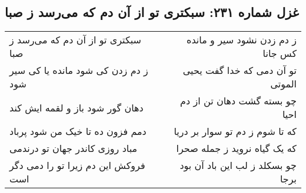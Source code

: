 \begin{center}
\section*{غزل شماره ۲۳۱: سبکتری تو از آن دم که می‌رسد ز صبا}
\label{sec:0231}
\begin{longtable}{l p{0.5cm} r}
سبکتری تو از آن دم که می‌رسد ز صبا
&&
ز دم زدن نشود سیر و مانده کس جانا
\\
ز دم زدن کی شود مانده یا کی سیر شود
&&
تو آن دمی که خدا گفت یحیی الموتی
\\
دهان گور شود باز و لقمه ایش کند
&&
چو بسته گشت دهان تن از دم احیا
\\
دمم فزون ده تا خیک من شود پرباد
&&
که تا شوم ز دم تو سوار بر دریا
\\
مباد روزی کاندر جهان تو درندمی
&&
که یک گیاه نروید ز جمله صحرا
\\
فروکش این دم زیرا تو را دمی دگر است
&&
چو بسکلد ز لب این باد آن بود برجا
\\
\end{longtable}
\end{center}
